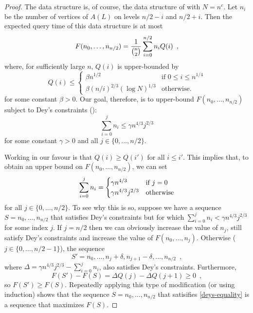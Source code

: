 \documentclass{patmorin}
\begin{document}
\begin{proof}
  The data structure is, of course, the data structure of
   with $N=n^c$.  Let $n_i$ be the number of vertices
  of $A(L)$ on levels $n/2-i$ and $n/2+i$.  Then the expected query time
  of this data structure is at most
  \begin{equation}
    F(n_0,\ldots,n_{n/2}) 
      = \frac{1}{\binom{n}{2}}\sum_{i=0}^{n/2} n_i Q(i) \enspace ,
     \eqlabel{expected}
  \end{equation}
  where, for sufficiently large $n$, $Q(i)$ is upper-bounded by
  \[
        Q(i) \le \begin{cases}
          \beta n^{1/2} & \text{if $0\le i \le n^{1/4}$} \\
          \beta (n/i)^{2/3}(\log N)^{1/3}  & \text{otherwise} .
        \end{cases}
  \]
  for some constant $\beta>0$.   Our goal, therefore, is to upper-bound
  $F(n_0,\ldots,n_{n/2})$ subject to Dey's constraints ():
  \[
     \sum_{i=0}^{j}n_i \le \gamma n^{4/3}j^{2/3} 
  \]
  for some constant $\gamma>0$ and all $j\in\{0,\ldots,n/2\}$.

  Working in our favour is that $Q(i) \ge Q(i')$ for all $i \le i'$.
  This implies that, to obtain an upper bound on $F(n_0,\ldots,n_{n/2})$,
  we can set
  \begin{equation}
      \sum_{i=0}^{j}n_i = 
        \begin{cases}
           \gamma n^{4/3} & \text{if $j=0$} \\
           \gamma n^{4/3}j^{2/3} & \text{otherwise}
        \end{cases}  \eqlabel{deys-equality}
  \end{equation}
  for all $j\in\{0,\ldots,n/2\}$.  To see why this is so, suppose we have
  a sequence $S=n_0,\ldots,n_{n/2}$ that satisfies Dey's constraints
  but for which $\sum_{i=0}^{j}n_i < \gamma n^{4/3}j^{2/3}$ for some index
  $j$. If $j=n/2$ then we can obviously increase the value of $n_j$, still
  satisfy Dey's constraints and increase the value of $F(n_0,\ldots,n_j)$.
  Otherwise ($j\in\{0,\ldots,n/2-1\}$), the sequence
  \[
     S'=n_0,\ldots,n_{j}+\delta,n_{j+1}-\delta,\ldots,n_{n/2} \enspace ,
  \]
  where $\Delta=\gamma n^{4/3}j^{2/3}-\sum_{i=0}^{j}n_i$, also satisfies
  Dey's constraints.  Furthermore, 
  \[  F(S')-F(S) = \Delta Q(j) - \Delta Q(j+1) \ge 0 \enspace , \]
  so $F(S')\ge F(S)$.  Repeatedly applying this type of modification (or
  using induction) shows that the sequence $S=n_0,\ldots,n_{n/2}$ that
  satisifies \eqref{deys-equality} is a sequence that maximizes $F(S)$.


\end{proof}
\end{document}
